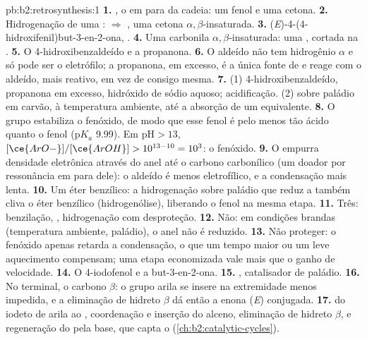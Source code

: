 \begin{solution}{pb:b2:retrosynthesis:1}
\textbf{1.} , o  em para da cadeia: um fenol e uma cetona.
\textbf{2.} Hidrogenação de uma :  $\Rightarrow$ , uma
cetona $\alpha,\beta$-insaturada.
\textbf{3.} (\textit{E})-4-(4-hidroxifenil)but-3-en-2-ona, .
\textbf{4.} Uma carbonila $\alpha,\beta$-insaturada: uma , cortada na .
\textbf{5.} O 4-hidroxibenzaldeído e a propanona.
\textbf{6.} O aldeído não tem hidrogênio $\alpha$ e só pode ser o eletrófilo; a propanona, em excesso,
é a única fonte de  e reage com o aldeído, mais reativo, em vez de consigo mesma.
\textbf{7.} (1) 4-hidroxibenzaldeído, propanona em excesso, hidróxido de sódio aquoso; acidificação. (2)
 sobre paládio em carvão, à temperatura ambiente, até a absorção de um equivalente.
\textbf{8.} O grupo  estabiliza o fenóxido, de modo que esse fenol é pelo menos tão ácido quanto
o fenol ($\mathrm pK_a$ 9.99). Em $\mathrm{pH} > 13$, $[\ce{ArO-}]/[\ce{ArOH}] > 10^{13-10} = 10^3$: o
fenóxido.
\textbf{9.} O  empurra densidade eletrônica através do anel até o carbono carbonílico (um doador
por ressonância em para dele): o aldeído é menos eletrofílico, e a condensação mais lenta.
\textbf{10.} Um éter benzílico: a hidrogenação sobre paládio que reduz a  também cliva o éter
benzílico (hidrogenólise), liberando o fenol na mesma etapa.
\textbf{11.} Três: benzilação, , hidrogenação com desproteção.
\textbf{12.} Não: em condições brandas (temperatura ambiente, paládio), o anel  não é reduzido.
\textbf{13.} Não proteger: o fenóxido apenas retarda a condensação, o que um tempo maior ou um leve
aquecimento compensam; uma etapa economizada vale mais que o ganho de velocidade.
\textbf{14.} O 4-iodofenol e a but-3-en-2-ona.
\textbf{15.} , catalisador de paládio.
\textbf{16.} No  terminal, o carbono $\beta$: o grupo arila se insere na extremidade menos
impedida, e a eliminação de hidreto $\beta$ dá então a enona (\textit{E}) conjugada.
\textbf{17.}  do iodeto de arila ao , coordenação e inserção do alceno,
eliminação de hidreto $\beta$, e regeneração do  pela base, que capta o 
(\cref{ch:b2:catalytic-cycles}).

\end{solution}

